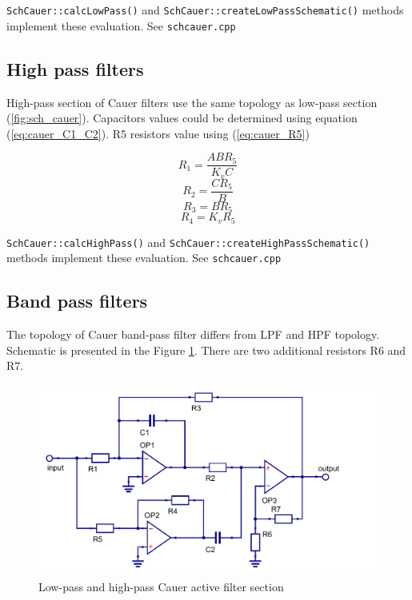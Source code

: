 \verb|SchCauer::calcLowPass()| and \verb|SchCauer::createLowPassSchematic()|
methods implement these evaluation. See \verb|schcauer.cpp|



\subsection{High pass filters}

High-pass section of Cauer filters use the same topology as low-pass section
(\ref{fig:sch_cauer}). Capacitors values could be determined using equation
(\ref{eq:cauer_C1_C2}). R5 resistors value using (\ref{eq:cauer_R5})

\begin{equation}
 R_1 = \frac{A B R_5}{K_v C}
\end{equation}
\begin{equation}
 R_2 = \frac{C R_5}{B}
\end{equation}
\begin{equation}
 R_3=B R_5
\end{equation}
\begin{equation}
 R_4 = K_v R_5
\end{equation}

\verb|SchCauer::calcHighPass()| and \verb|SchCauer::createHighPassSchematic()|
methods implement these evaluation. See \verb|schcauer.cpp|


\subsection{Band pass filters}

The topology of Cauer band-pass filter differs from LPF and HPF topology. 
Schematic is presented in the Figure \ref{fig:sch_bandpass}. There are two 
additional resistors R6 and R7.

\begin{figure}[!ht]
  \centering
  \includegraphics[width=0.8\linewidth]{pics/cauer-bandpass}
  \caption{Low-pass and high-pass Cauer active filter section}
  \label{fig:sch_bandpass}
\end{figure}

